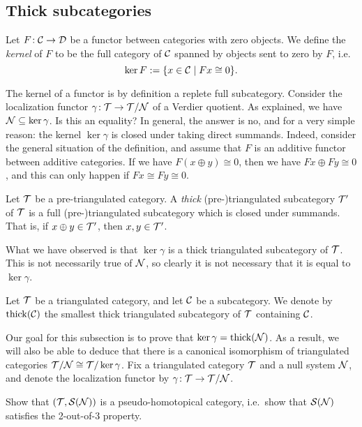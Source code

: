 \subsection{Thick subcategories}
\begin{definition}
	Let \(F\!:\mathcal{C}\to\mathcal{D}\) be a functor between categories with zero objects. We define the \emph{kernel} of \(F\) to be the full category of \(\mathcal{C}\) spanned by objects sent
	to zero by \(F\), i.e.
	\[ \ker{F} := \{ x\in\mathcal{C}\mid Fx\cong 0 \}. \]
\end{definition}

The kernel of a functor is by definition a replete full subcategory. Consider the localization functor \(\gamma\!:\mathcal{T}\to\mathcal{T}/\mathcal{N}\) of a Verdier quotient. As explained,
we have \(\mathcal{N}\subseteq\ker{\gamma}\). Is this an equality? In general, the answer is no, and for a very simple reason: the kernel \(\ker\gamma\) is closed under taking direct summands.
Indeed, consider the general situation of the definition, and assume that \(F\) is an additive functor between additive categories. If we have \(F(x\oplus y) \cong 0\), then
we have \(Fx\oplus Fy \cong 0\), and this can only happen if \(Fx\cong Fy\cong 0\).
\begin{definition}
	Let \(\mathcal{T}\) be a pre-triangulated category. A \emph{thick} (pre-)triangulated subcategory \(\mathcal{T}'\) of \(\mathcal{T}\) is a full (pre-)triangulated subcategory which is closed under summands.
	That is, if \(x\oplus y\in\mathcal{T}'\), then \(x,y\in\mathcal{T}'\).
\end{definition}

What we have observed is that \(\ker\gamma\) is a thick triangulated subcategory of \(\mathcal{T}\). This is not necessarily true of \(\mathcal{N}\), so clearly it is not necessary that it is equal to \(\ker\gamma\).
\begin{notation}
	Let \(\mathcal{T}\) be a triangulated category, and let \(\mathcal{C}\) be a subcategory. We denote by \(\operatorname{thick}(\mathcal{C})\) the smallest thick triangulated subcategory of \(\mathcal{T}\) containing \(\mathcal{C}\).
\end{notation}

Our goal for this subsection is to prove that \(\ker\gamma = \operatorname{thick}(\mathcal{N})\). As a result, we will also be able to deduce that there is a canonical isomorphism of triangulated categories
\(\mathcal{T}/\mathcal{N} \cong \mathcal{T}/\ker\gamma\). Fix a triangulated category \(\mathcal{T}\) and a null system \(\mathcal{N}\), and denote the localization functor by \(\gamma\!:\mathcal{T}\to\mathcal{T}/\mathcal{N}\).

\begin{exercise}\label{exercise:S(N)-2-out-of-3-property}
	Show that \((\mathcal{T},\mathcal{S}(\mathcal{N}))\) is a pseudo-homotopical category, i.e.\ show that \(\mathcal{S}(\mathcal{N})\) satisfies the 2-out-of-3 property.
\end{exercise}

